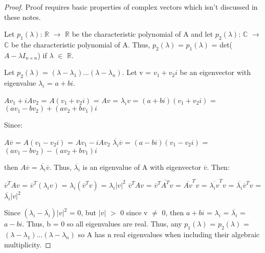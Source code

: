     \begin{proof}
        Proof requires basic properties of complex vectors
        which isn't discussed in these notes. 

        Let $p_1(\lambda)$: $\mathbb{R}$ $\rightarrow$ $\mathbb{R}$
        be the characteristic polynomial of A and
        let $p_2(\lambda)$: $\mathbb{C}$ $\rightarrow$ $\mathbb{C}$
        be the characteristic polynomial of A.
        Thus, $p_2(\lambda)$ = $p_1(\lambda)$ = det($A - \lambda I_{n \times n}$)
        if $\lambda$ $\in$ $\mathbb{R}$.

        Let $p_2(\lambda)$ = $(\lambda - \lambda_1)...(\lambda - \lambda_n)$.
        Let v = $v_1 + v_2i$ be an eigenvector with eigenvalue
        $\lambda_i$ = $a + bi$.

        \hspace{0.5cm}
        $Av_1 + iAv_2$
        = $A(v_1+v_2i)$
        = $Av$
        = $\lambda_i v$
        = $(a+bi)(v_1 + v_2i)$
        = $(av_1 - bv_2) + (av_2 + bv_1)i$

        Since:

        \hspace{0.5cm}
        $A\overline{v}$
        = $A(v_1 - v_2i)$
        = $Av_1 - iAv_2$
        \hspace{1cm}
        $\overline{\lambda_i} \overline{v}$
        = $(a-bi)(v_1 - v_2i)$
        = $(av_1 - bv_2) - (av_2 + bv_1)i$

        then $A\overline{v}$ = $\overline{\lambda_i} \overline{v}$.
        Thus, $\overline{\lambda_i}$ is an eigenvalue of A with eigenvector
        $\overline{v}$. Then:

        \hspace{0.5cm}
        $\overline{v}^T Av$
        = $\overline{v}^T (\lambda_i v)$
        = $\lambda_i(\overline{v}^T v)$
        = $\lambda_i |v|^2$
        \hspace{0.5cm}
        $\overline{v}^T Av$
        = $\overline{v}^T \overline{A^T} v$
        = $\overline{Av}^T v$
        = $\overline{\lambda_i v}^T v$
        = $\overline{\lambda_i} \overline{v}^T v$
        = $\overline{\lambda_i} |v|^2$

        Since $(\lambda_i - \overline{\lambda_i})|v|^2$ = 0,
        but $|v|$ $>$ 0 since v $\not =$ 0, then
        $a+bi$ = $\lambda_i$ = $\overline{\lambda_i}$ = $a-bi$.
        Thus, b = 0 so all eigenvalues are real.
        Thus, any $p_1(\lambda)$ = $p_2(\lambda)$
        = $(\lambda - \lambda_1)...(\lambda - \lambda_n)$
        so A has n real eigenvalues when including their algebraic multiplicity.
    \end{proof}

